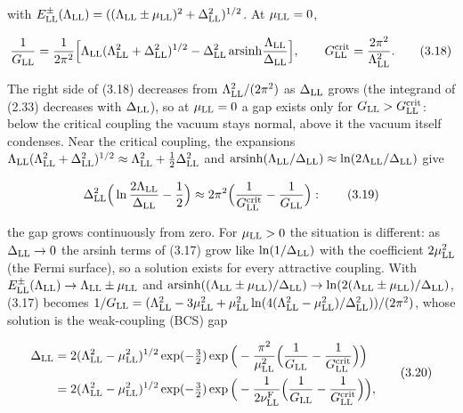 \documentclass[
  10pt,
]{article}
\begin{document}
with
\(E^\pm_{\rm LL}(\Lambda_{\rm LL})=((\Lambda_{\rm LL}\pm\mu_{\rm LL})^2+\Delta_{\rm LL}^2)^{1/2}\).
At \(\mu_{\rm LL}=0\),

\[\frac1{G_{\rm LL}}=\frac1{2\pi^2}\Big[\Lambda_{\rm LL}(\Lambda_{\rm LL}^2+\Delta_{\rm LL}^2)^{1/2}-\Delta_{\rm LL}^2\,\mathrm{arsinh}\frac{\Lambda_{\rm LL}}{\Delta_{\rm LL}}\Big],\qquad G^{\rm crit}_{\rm LL}=\frac{2\pi^2}{\Lambda_{\rm LL}^2}.\tag{3.18}\]

The right side of (3.18) decreases from \(\Lambda_{\rm LL}^2/(2\pi^2)\)
as \(\Delta_{\rm LL}\) grows (the integrand of (2.33) decreases with
\(\Delta_{\rm LL}\)), so at \(\mu_{\rm LL}=0\) a gap exists only for
\(G_{\rm LL}>G^{\rm crit}_{\rm LL}\): below the critical coupling the
vacuum stays normal, above it the vacuum itself condenses. Near the
critical coupling, the expansions
\(\Lambda_{\rm LL}(\Lambda_{\rm LL}^2+\Delta_{\rm LL}^2)^{1/2}\approx\Lambda_{\rm LL}^2+\tfrac12\Delta_{\rm LL}^2\)
and
\(\mathrm{arsinh}(\Lambda_{\rm LL}/\Delta_{\rm LL})\approx\ln(2\Lambda_{\rm LL}/\Delta_{\rm LL})\)
give

\[\Delta_{\rm LL}^2\Big(\ln\frac{2\Lambda_{\rm LL}}{\Delta_{\rm LL}}-\frac12\Big)\approx2\pi^2\Big(\frac1{G^{\rm crit}_{\rm LL}}-\frac1{G_{\rm LL}}\Big):\tag{3.19}\]

the gap grows continuously from zero. For \(\mu_{\rm LL}>0\) the
situation is different: as \(\Delta_{\rm LL}\to0\) the arsinh terms of
(3.17) grow like \(\ln(1/\Delta_{\rm LL})\) with the coefficient
\(2\mu_{\rm LL}^2\) (the Fermi surface), so a solution exists for every
attractive coupling. With
\(E^\pm_{\rm LL}(\Lambda_{\rm LL})\to\Lambda_{\rm LL}\pm\mu_{\rm LL}\)
and
\(\mathrm{arsinh}((\Lambda_{\rm LL}\pm\mu_{\rm LL})/\Delta_{\rm LL})\to\ln(2(\Lambda_{\rm LL}\pm\mu_{\rm LL})/\Delta_{\rm LL})\),
(3.17) becomes
\(1/G_{\rm LL}=(\Lambda_{\rm LL}^2-3\mu_{\rm LL}^2+\mu_{\rm LL}^2\ln(4(\Lambda_{\rm LL}^2-\mu_{\rm LL}^2)/\Delta_{\rm LL}^2))/(2\pi^2)\),
whose solution is the weak-coupling (BCS) gap

\[\begin{aligned}\Delta_{\rm LL}&=2(\Lambda_{\rm LL}^2-\mu_{\rm LL}^2)^{1/2}\exp(-\tfrac32)\exp\Big(-\frac{\pi^2}{\mu_{\rm LL}^2}\Big(\frac1{G_{\rm LL}}-\frac1{G^{\rm crit}_{\rm LL}}\Big)\Big)\\&=2(\Lambda_{\rm LL}^2-\mu_{\rm LL}^2)^{1/2}\exp(-\tfrac32)\exp\Big(-\frac1{2\nu^{\rm F}_{\rm LL}}\Big(\frac1{G_{\rm LL}}-\frac1{G^{\rm crit}_{\rm LL}}\Big)\Big),\end{aligned}\tag{3.20}\]
\end{document}
